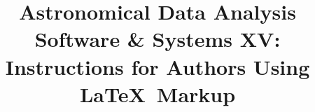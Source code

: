 \documentclass[11pt,twoside]{article}
\begin{document}
%
%
%


%
%
%
%

\title{Astronomical Data Analysis Software \& Systems XV:
   Instructions for Authors Using \LaTeX\ Markup}

%
%
%
\end{document}
